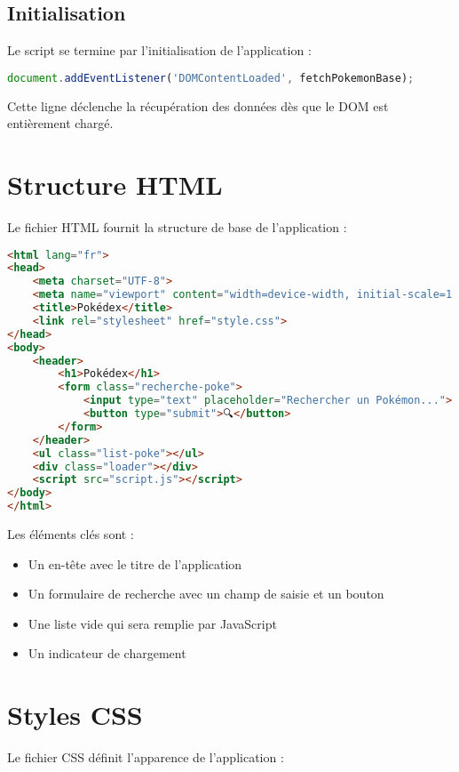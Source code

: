 \documentclass{article}
\begin{document}
\subsection{Initialisation}
Le script se termine par l'initialisation de l'application :

\begin{lstlisting}[language=JavaScript]
document.addEventListener('DOMContentLoaded', fetchPokemonBase);
\end{lstlisting}

Cette ligne déclenche la récupération des données dès que le DOM est entièrement chargé.

\section{Structure HTML}
Le fichier HTML fournit la structure de base de l'application :

\begin{lstlisting}[language=HTML]
<html lang="fr">
<head>
    <meta charset="UTF-8">
    <meta name="viewport" content="width=device-width, initial-scale=1.0">
    <title>Pokédex</title>
    <link rel="stylesheet" href="style.css">
</head>
<body>
    <header>
        <h1>Pokédex</h1>
        <form class="recherche-poke">
            <input type="text" placeholder="Rechercher un Pokémon...">
            <button type="submit">🔍</button>
        </form>
    </header>
    <ul class="list-poke"></ul>
    <div class="loader"></div>
    <script src="script.js"></script>
</body>
</html>
\end{lstlisting}

Les éléments clés sont :
\begin{itemize}
    \item Un en-tête avec le titre de l'application
    \item Un formulaire de recherche avec un champ de saisie et un bouton
    \item Une liste vide qui sera remplie par JavaScript
    \item Un indicateur de chargement
\end{itemize}

\section{Styles CSS}
Le fichier CSS définit l'apparence de l'application :
\end{document}
